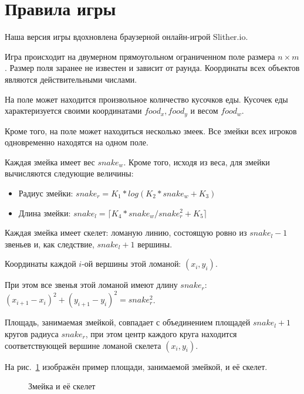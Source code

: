 \documentclass[12pt, a4paper]{article}
\begin{document}
{\section{Правила игры}}

Наша версия игры вдохновлена браузерной онлайн-игрой Slither.io.

Игра происходит на двумерном прямоугольном ограниченном поле размера $n \times m$. Размер поля заранее не известен и зависит от раунда. Координаты всех объектов являются действительными числами.

На поле может находится произвольное количество кусочков еды. Кусочек еды характеризуется своими координатами $food_x, food_y$ и весом $food_w$.

Кроме того, на поле может находиться несколько змеек. Все змейки всех игроков одновременно находятся на одном поле.

Каждая змейка имеет вес $snake_w$. Кроме того, исходя из веса, для змейки вычисляются следующие величины:

\begin{itemize}
\item Радиус змейки: $snake_r = K_1 * log(K_2 * snake_w + K_3)$
\item Длина змейки: $snake_l = \lceil K_4 * snake_w / snake_r^2 + K_5 \rceil $
\end{itemize}

Каждая змейка имеет скелет: ломаную линию, состоящую ровно из $snake_l - 1$ звеньев и, как следствие, $snake_l + 1$ вершины.

Координаты каждой $i$-ой вершины этой ломаной: $(x_i, y_i)$.

При этом все звенья этой ломаной имеют длину $snake_r$: $(x_{i+1} - x_i)^2 + (y_{i+1} - y_i)^2 = snake_r^2$.

Площадь, занимаемая змейкой, совпадает с объединением площадей $snake_l + 1$ кругов радиуса $snake_r$, при этом центр каждого круга находится соответствующей вершине ломаной скелета $(x_i, y_i)$. 

На рис.~\ref{ris:image} изображён пример площади, занимаемой змейкой, и её скелет. 

\begin{figure}[h]
\caption{Змейка и её скелет}
\label{ris:image}
\end{figure}
\end{document}
